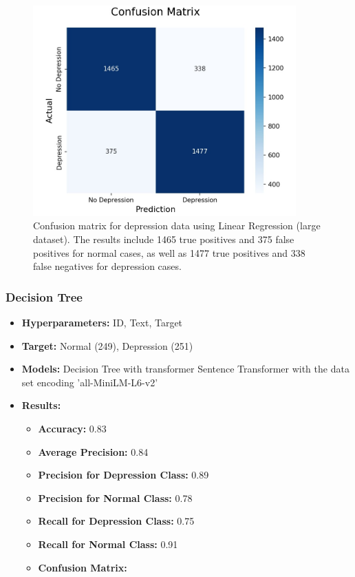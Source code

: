 \documentclass[runningheads,a4paper,11pt]{report}
\begin{document}
\begin{figure}[h]
\centering
\includegraphics[width=0.9\textwidth]{Depression-Data-LinearRegression.jpg}
\caption[Confusion matrix for depression data (linear regression)]{Confusion matrix for depression data using Linear Regression (large dataset). The results include 1465 true positives and 375 false positives for normal cases, as well as 1477 true positives and 338 false negatives for depression cases.}
\end{figure}

\vspace{0.5cm} %

\subsubsection{Decision Tree}
\label{section:tree}

\begin{itemize}
    \item \textbf{Hyperparameters:} ID, Text, Target
    \item \textbf{Target:} Normal (249), Depression (251)
    \item \textbf{Models:} Decision Tree with transformer Sentence Transformer with the data set encoding 'all-MiniLM-L6-v2'
    \item \textbf{Results:}
    \begin{itemize}
        \item \textbf{Accuracy:} 0.83
        \item \textbf{Average Precision:} 0.84
        \item \textbf{Precision for Depression Class:} 0.89
        \item \textbf{Precision for Normal Class:} 0.78
        \item \textbf{Recall for Depression Class:} 0.75
        \item \textbf{Recall for Normal Class:} 0.91
        \item \textbf{Confusion Matrix:}
    \end{itemize}
\end{itemize}
\end{document}

